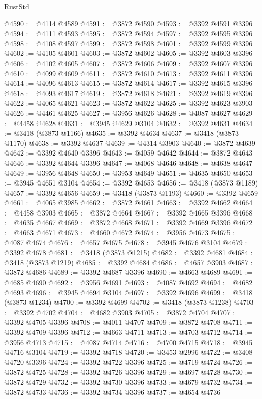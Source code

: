 \begin{lexlean}{RustStd}
\begin{coremodule}
@4590 := @4114 @4589
@4591 := @3872 @4590
@4593 := @3392 @4591 @3396
@4594 := @4111 @4593
@4595 := @3872 @4594
@4597 := @3392 @4595 @3396
@4598 := @4108 @4597
@4599 := @3872 @4598
@4601 := @3392 @4599 @3396
@4602 := @4105 @4601
@4603 := @3872 @4602
@4605 := @3392 @4603 @3396
@4606 := @4102 @4605
@4607 := @3872 @4606
@4609 := @3392 @4607 @3396
@4610 := @4099 @4609
@4611 := @3872 @4610
@4613 := @3392 @4611 @3396
@4614 := @4096 @4613
@4615 := @3872 @4614
@4617 := @3392 @4615 @3396
@4618 := @4093 @4617
@4619 := @3872 @4618
@4621 := @3392 @4619 @3396
@4622 := @4065 @4621
@4623 := @3872 @4622
@4625 := @3392 @4623 @3903
@4626 := @4461 @4625
@4627 := @3956 @4626
@4628 := @4087 @4627
@4629 := @4458 @4628
@4631 := @3945 @4629 @3104
@4632 := @3392 @4631
@4634 := @3418 (@3873 @1166)
@4635 := @3392 @4634
@4637 := @3418 (@3873 @1170)
@4638 := @3392 @4637
@4639 := @4314 @3903
@4640 := @3872 @4639
@4642 := @3392 @4640 @3396
@4643 := @4059 @4642
@4644 := @3872 @4643
@4646 := @3392 @4644 @3396
@4647 := @4068 @4646
@4648 := @4638 @4647
@4649 := @3956 @4648
@4650 := @3953 @4649
@4651 := @4635 @4650
@4653 := @3945 @4651 @3104
@4654 := @3392 @4653
@4656 := @3418 (@3873 @1189)
@4657 := @3392 @4656
@4659 := @3418 (@3873 @1193)
@4660 := @3392 @4659
@4661 := @4065 @3985
@4662 := @3872 @4661
@4663 := @3392 @4662
@4664 := @4458 @3903
@4665 := @3872 @4664
@4667 := @3392 @4665 @3396
@4668 := @4635 @4667
@4669 := @3872 @4668
@4671 := @3392 @4669 @3396
@4672 := @4663 @4671
@4673 := @4660 @4672
@4674 := @3956 @4673
@4675 := @4087 @4674
@4676 := @4657 @4675
@4678 := @3945 @4676 @3104
@4679 := @3392 @4678
@4681 := @3418 (@3873 @1215)
@4682 := @3392 @4681
@4684 := @3418 (@3873 @1219)
@4685 := @3392 @4684
@4686 := @4657 @3903
@4687 := @3872 @4686
@4689 := @3392 @4687 @3396
@4690 := @4663 @4689
@4691 := @4685 @4690
@4692 := @3956 @4691
@4693 := @4087 @4692
@4694 := @4682 @4693
@4696 := @3945 @4694 @3104
@4697 := @3392 @4696
@4699 := @3418 (@3873 @1234)
@4700 := @3392 @4699
@4702 := @3418 (@3873 @1238)
@4703 := @3392 @4702
@4704 := @4682 @3903
@4705 := @3872 @4704
@4707 := @3392 @4705 @3396
@4708 := @4011 @4707
@4709 := @3872 @4708
@4711 := @3392 @4709 @3396
@4712 := @4663 @4711
@4713 := @4703 @4712
@4714 := @3956 @4713
@4715 := @4087 @4714
@4716 := @4700 @4715
@4718 := @3945 @4716 @3104
@4719 := @3392 @4718
@4720 := @3453 @2996
@4722 := @3408 @4720 @3396
@4724 := @3392 @4722 @3396
@4725 := @4719 @4724
@4726 := @3872 @4725
@4728 := @3392 @4726 @3396
@4729 := @4697 @4728
@4730 := @3872 @4729
@4732 := @3392 @4730 @3396
@4733 := @4679 @4732
@4734 := @3872 @4733
@4736 := @3392 @4734 @3396
@4737 := @4654 @4736

\end{coremodule}
\end{lexlean}
